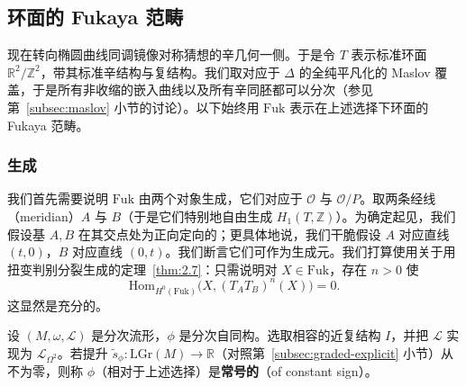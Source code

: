

\subsection{环面的 Fukaya 范畴}\label{subsec:6.3}

现在转向椭圆曲线同调镜像对称猜想的辛几何一侧。于是令 $T$ 表示标准环面 $\mathbb{R}^2/\mathbb{Z}^2$，带其标准辛结构与复结构。我们取对应于 $\Delta$ 的全纯平凡化的 Maslov 覆盖，于是所有非收缩的嵌入曲线以及所有辛同胚都可以分次（参见第~\ref{subsec:maslov} 小节的讨论）。以下始终用 $\mathrm{Fuk}$ 表示在上述选择下环面的 Fukaya 范畴。

\subsubsection{生成}\label{subsec:generation}

我们首先需要说明 $\mathrm{Fuk}$ 由两个对象生成，它们对应于 $\mathcal{O}$ 与 $\mathcal{O}/P$。取两条经线（meridian）$A$ 与 $B$（于是它们特别地自由生成 $H_1(T,\mathbb{Z})$）。为确定起见，我们假设基 $A,B$ 在其交点处为正向定向的；更具体地说，我们干脆假设 $A$ 对应直线 $(t,0)$，$B$ 对应直线 $(0,t)$。我们断言它们可作为生成元。我们打算使用关于用扭变判别分裂生成的定理~\ref{thm:2.7}：只需说明对 $X\in\mathrm{Fuk}$，存在 $n>0$ 使
\[
\mathrm{Hom}_{H^0(\mathrm{Fuk})}\bigl(X,(T_AT_B)^n(X)\bigr)=0.
\]
这显然是充分的。

\begin{definition*}\label{def:constant-sign}
设 $(M,\omega,\mathcal{L})$ 是分次流形，$\phi$ 是分次自同构。选取相容的近复结构 $I$，并把 $\mathcal{L}$ 实现为 $\mathcal{L}_{\Omega^2}$。若提升 $\tilde{s}_\phi:\mathrm{LGr}(M)\to\mathbb{R}$（对照第~\ref{subsec:graded-explicit} 小节）从不为零，则称 $\phi$（相对于上述选择）是\textbf{常号的}（of constant sign）。
\end{definition*}

